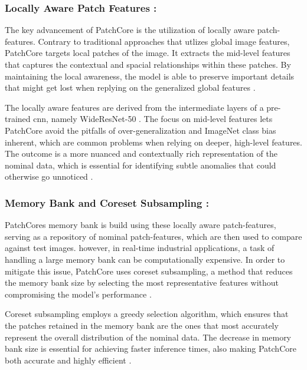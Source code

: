 \subsubsection*{Locally Aware Patch Features :} 
The key advancement of PatchCore is the utilization of locally aware patch-features. Contrary to traditional approaches that utlizes global image features, PatchCore targets local patches of the image. It extracts the mid-level features that captures the contextual and spacial relationships within these patches. By maintaining the local awareness, the model is able to preserve important details that might get lost when replying on the generalized global features \cite{roth2022totalrecallindustrialanomaly}.

The locally aware features are derived from the intermediate layers of a pre-trained \gls{cnn}, namely WideResNet-50 \cite{zagoruyko2017wideresidualnetworks}. The focus on mid-level features lets PatchCore avoid the pitfalls of over-generalization and ImageNet class bias inherent, which are common problems when relying on deeper, high-level features. The outcome is a more nuanced and contextually rich representation of the nominal data, which is essential for identifying subtle anomalies that could otherwise go unnoticed \cite{roth2022totalrecallindustrialanomaly}.

\subsubsection*{Memory Bank and Coreset Subsampling :}

PatchCores memory bank is build using these locally aware patch-features, serving as a repository of nominal patch-features, which are then used to compare against test images. however, in real-time industrial applications, a task of handling a large memory bank can be computationally expensive. In order to mitigate this issue, PatchCore uses coreset subsampling, a method that reduces the memory bank size by selecting the most representative features without compromising the model's performance \cite{roth2022totalrecallindustrialanomaly}.

Coreset subsampling employs a greedy selection algorithm, which ensures that the patches retained in the memory bank are the ones that most accurately represent the overall distribution of the nominal data. The decrease in memory bank size is essential for achieving faster inference times, also making PatchCore both accurate and highly efficient \cite{roth2022totalrecallindustrialanomaly}.

